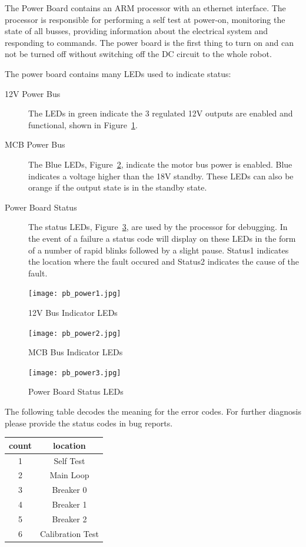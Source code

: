 The Power Board contains an ARM processor with an ethernet interface. The
processor is responsible for performing a self test at power-on, monitoring the
state of all busses, providing information about the electrical system and
responding to commands. The power board is the first thing to turn on and can
not be turned off without switching off the DC circuit to the whole robot.

The power board contains many LEDs used to indicate status:
\begin{description}
\item[12V Power Bus] The LEDs in green indicate the 3 regulated 12V
  outputs are enabled and functional, shown in Figure~\ref{fig:12Vbus}.
\item[MCB Power Bus]The Blue LEDs, Figure~\ref{fig:MCBbus}, indicate
  the motor bus power is enabled. Blue indicates a voltage higher than
  the 18V standby. These LEDs can also be orange if the output state
  is in the standby state.

\item[Power Board Status]The status LEDs,
  Figure~\ref{fig:powerboardstatus}, are used by the processor for
  debugging. In the event of a failure a status code will display on
  these LEDs in the form of a number of rapid blinks followed
  by a slight pause.  Status1 indicates the location where the fault
  occured and Status2 indicates the cause of the fault.
\end{description}


\begin{figure}[htb]
\centering
\texttt{[image: pb\_power1.jpg]}
\caption{12V Bus Indicator LEDs}
\label{fig:12Vbus}
\end{figure}

\begin{figure}[htb]
\centering
\texttt{[image: pb\_power2.jpg]}
\caption{MCB Bus Indicator LEDs}
\label{fig:MCBbus}
\end{figure}

\begin{figure}[htb]
\centering
\texttt{[image: pb\_power3.jpg]}
\caption{Power Board Status LEDs}
\label{fig:powerboardstatus}
\end{figure}


The following table decodes the meaning for the error codes. For further
diagnosis please provide the status codes in bug reports.

\begin{tabular}{|c|c|}
\hline
count & location \\
\hline
\hline
1 & Self Test \\
\hline
2 & Main Loop \\
\hline
3 & Breaker 0 \\
\hline
4 & Breaker 1 \\
\hline
5 & Breaker 2 \\
\hline
6 & Calibration Test \\
\hline
\end{tabular}

